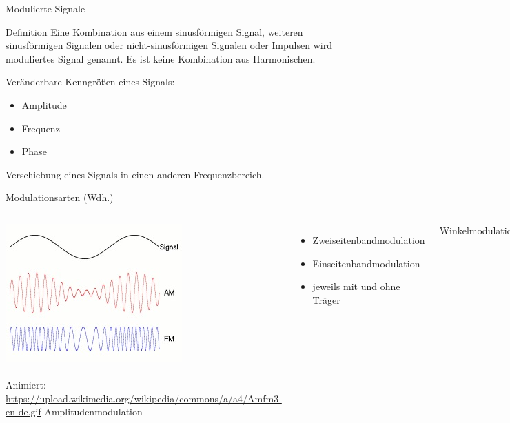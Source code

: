 \begin{frame}{Modulierte Signale}
  \begin{block}{Definition}
    Eine Kombination aus einem sinusförmigen Signal, weiteren sinusförmigen Signalen oder nicht-sinusförmigen Signalen oder Impulsen wird moduliertes Signal genannt. Es ist keine Kombination aus Harmonischen.
  \end{block}
  \vspace{2em}
  Veränderbare Kenngrößen eines Signals:
  \begin{itemize}
    \item Amplitude
    \item Frequenz
    \item Phase
  \end{itemize}
  \vspace{2em}
  Verschiebung eines Signals in einen anderen Frequenzbereich.
\end{frame}

\begin{frame}{Modulationsarten (Wdh.)}
  \begin{columns}[c]
      \includegraphics[width=\textwidth,height=.80\textheight,keepaspectratio]{e14/modulationen.jpg}\\
      {\tiny \hyperlink{refs}{\cite{wm}}}\\
      {\tiny Animiert: \url{https://upload.wikimedia.org/wikipedia/commons/a/a4/Amfm3-en-de.gif}}
      Amplitudenmodulation
      \begin{itemize}
        \item Zweiseitenbandmodulation
        \item Einseitenbandmodulation
        \item jeweils mit und ohne Träger
      \end{itemize}
      Winkelmodulation
      \begin{itemize}
        \item Frequenzmodulation
        \item Phasenmodulation
      \end{itemize}
  \end{columns}
\end{frame}


